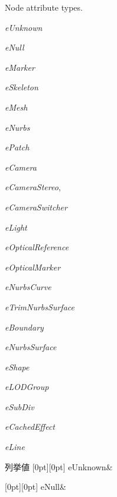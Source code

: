 Node attribute types.
\begin{DoxyItemize}
\item {\itshape e\+Unknown} 
\item {\itshape e\+Null} 
\item {\itshape e\+Marker} 
\item {\itshape e\+Skeleton} 
\item {\itshape e\+Mesh} 
\item {\itshape e\+Nurbs} 
\item {\itshape e\+Patch} 
\item {\itshape e\+Camera} 
\item {\itshape e\+Camera\+Stereo},
\item {\itshape e\+Camera\+Switcher} 
\item {\itshape e\+Light} 
\item {\itshape e\+Optical\+Reference} 
\item {\itshape e\+Optical\+Marker} 
\item {\itshape e\+Nurbs\+Curve} 
\item {\itshape e\+Trim\+Nurbs\+Surface} 
\item {\itshape e\+Boundary} 
\item {\itshape e\+Nurbs\+Surface} 
\item {\itshape e\+Shape} 
\item {\itshape e\+L\+O\+D\+Group} 
\item {\itshape e\+Sub\+Div} 
\item {\itshape e\+Cached\+Effect} 
\item {\itshape e\+Line} 
\end{DoxyItemize}\begin{DoxyEnumFields}{列挙値}
[0pt][0pt]{}\mbox{\label{class_fbx_node_attribute_a08e1669d3d1a696910756ab17de56d6aa253cd41494ed2a5f06183e4d886a84b8}} 
e\+Unknown&\\
\hline

[0pt][0pt]{}\mbox{\label{class_fbx_node_attribute_a08e1669d3d1a696910756ab17de56d6aa0d833bf35e77f67c8721f95d0e3b6d2c}} 
e\+Null&\\
\hline


\end{DoxyEnumFields}
